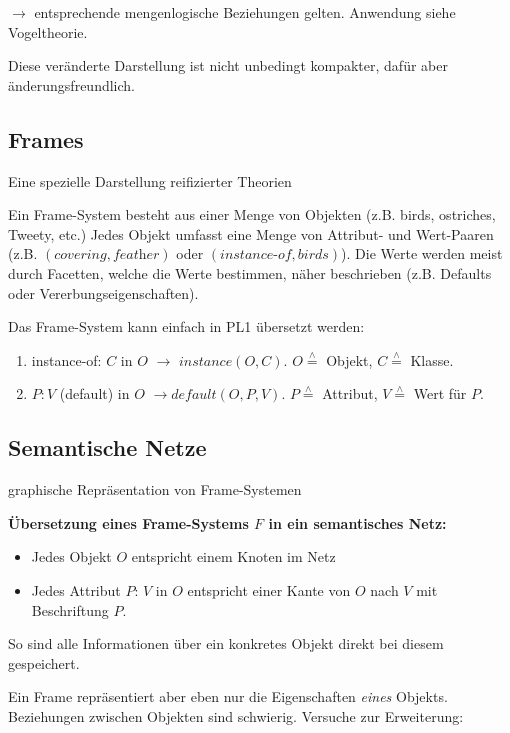 \documentclass[runningheads,deutsch]{llncs}
\newcommand{\estimates}{\overset{\scriptscriptstyle\wedge}{=}}
\begin{document}
$\rightarrow$ entsprechende mengenlogische Beziehungen gelten. Anwendung siehe Vogeltheorie.

Diese veränderte Darstellung ist nicht unbedingt kompakter, dafür aber änderungsfreundlich.

\subsection{Frames}

Eine spezielle Darstellung reifizierter Theorien

Ein Frame-System besteht aus einer Menge von Objekten (z.B. birds, ostriches, Tweety, etc.) Jedes Objekt umfasst eine Menge von Attribut- und Wert-Paaren (z.B. $(\textit{covering}, \textit{feather})$ oder $(\textit{instance-of}, \textit{birds})$). Die Werte werden meist durch Facetten, welche die Werte bestimmen, näher beschrieben (z.B. Defaults oder Vererbungseigenschaften).

Das Frame-System kann einfach in PL1 übersetzt werden:

\begin{enumerate}
    \item instance-of: $C$ in $O$ $\rightarrow$ $\textit{instance}(O, C)$. $O \estimates$ Objekt, $C \estimates$ Klasse.
    \item $P: V$ (default) in $O$ $\rightarrow \textit{default}(O, P, V)$. $P \estimates$ Attribut, $V \estimates$ Wert für $P$.
\end{enumerate}

\subsection{Semantische Netze}

graphische Repräsentation von Frame-Systemen

\textbf{Übersetzung eines Frame-Systems $F$ in ein semantisches Netz:}
\begin{itemize}
    \item Jedes Objekt $O$ entspricht einem Knoten im Netz
    \item Jedes Attribut $P$: $V$ in $O$ entspricht einer Kante von $O$ nach $V$ mit Beschriftung $P$.
\end{itemize}

So sind alle Informationen über ein konkretes Objekt direkt bei diesem gespeichert.

Ein Frame repräsentiert aber eben nur die Eigenschaften \textit{eines} Objekts. Beziehungen zwischen Objekten sind schwierig. Versuche zur Erweiterung:
\end{document}
